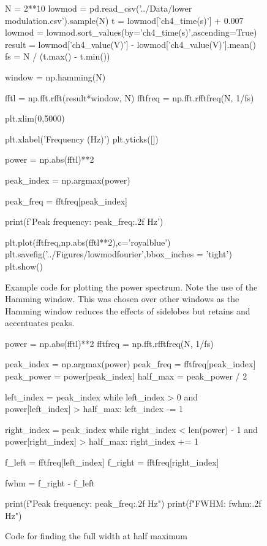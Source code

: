 \documentclass[aps,prl,reprint,10pt,amsmath,amssymb,superscriptaddress,a4paper]{revtex4-2}
\begin{document}
\begin{figure}
    \begin{python}
    N = 2**10
    lowmod = pd.read_csv('../Data/lower modulation.csv').sample(N)
    t = lowmod['ch4_time(s)'] + 0.007
    lowmod = lowmod.sort_values(by='ch4_time(s)',ascending=True)
    result = lowmod['ch4_value(V)'] - lowmod['ch4_value(V)'].mean()
    fs = N / (t.max() - t.min())

    window = np.hamming(N)

    fftl = np.fft.rfft(result*window, N)
    fftfreq = np.fft.rfftfreq(N, 1/fs)

    plt.xlim(0,5000)

    plt.xlabel('Frequency (Hz)')
    plt.yticks([])

    power = np.abs(fftl)**2

    peak_index = np.argmax(power)

    peak_freq = fftfreq[peak_index]

    print(f'Peak frequency: {peak_freq:.2f} Hz')

    plt.plot(fftfreq,np.abs(fftl**2),c='royalblue')
    plt.savefig('../Figures/lowmodfourier',bbox_inches = 'tight')
    plt.show()
    \end{python}
    \caption{Example code for plotting the power spectrum. Note the use of 
    the Hamming window. This was chosen over other windows as the Hamming window 
    reduces the effects of sidelobes but retains and accentuates peaks.}
\end{figure}

\begin{figure}
    \begin{python}
    power = np.abs(fftl)**2
    fftfreq = np.fft.rfftfreq(N, 1/fs)

    peak_index = np.argmax(power)
    peak_freq = fftfreq[peak_index]
    peak_power = power[peak_index]
    half_max = peak_power / 2

    left_index = peak_index
    while left_index > 0 and power[left_index] > half_max:
        left_index -= 1

    right_index = peak_index
    while right_index < len(power) - 1 and power[right_index] > half_max:
        right_index += 1

    f_left = fftfreq[left_index]
    f_right = fftfreq[right_index]

    fwhm = f_right - f_left

    print(f"Peak frequency: {peak_freq:.2f} Hz")
    print(f"FWHM: {fwhm:.2f} Hz")
    \end{python}
    \caption{Code for finding the full width at half maximum}
\end{figure}
\end{document}
